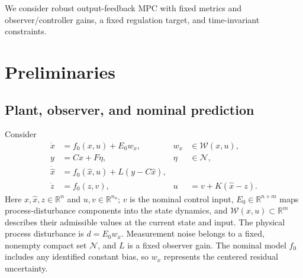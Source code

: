 \documentclass[11pt,a4paper]{article}
\numberwithin{equation}{section}
\theoremstyle{remark}\newtheorem{remark}{Remark}
\newcommand{\R}{\mathbb R}
\begin{document}
We consider robust output-feedback MPC with fixed metrics and observer/controller gains, a fixed regulation target, and time-invariant constraints.

\section{Preliminaries}
\subsection{Plant, observer, and nominal prediction}
Consider
\begin{subequations}\label{eq:system}
\begin{align}
\dot x &= f_0(x,u)+E_0w_x, & w_x&\in\mathcal W(x,u),\\
y &= Cx+F\eta, &\eta&\in\mathcal N,\\
\dot{\hat x}&=f_0(\hat x,u)+L(y-C\hat x),\\
\dot z&=f_0(z,v), & u&=v+K(\hat x-z).
\end{align}
\end{subequations}
Here $x,\hat x,z\in\R^n$ and $u,v\in\R^{n_u}$; $v$ is the nominal control input, $E_0\in\R^{n\times m}$ maps process-disturbance components into the state dynamics, and $\mathcal W(x,u)\subset\R^m$ describes their admissible values at the current state and input. The physical process disturbance is $d=E_0w_x$. Measurement noise belongs to a fixed, nonempty compact set $\mathcal N$, and $L$ is a fixed observer gain. The nominal model $f_0$ includes any identified constant bias, so $w_x$ represents the centered residual uncertainty.
\end{document}
